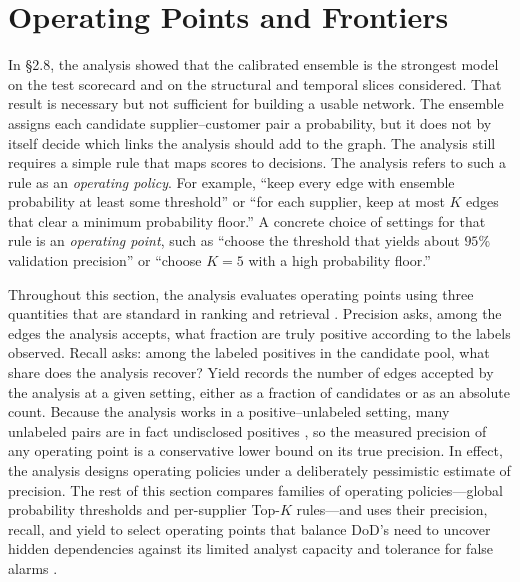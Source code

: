 \section{Operating Points and Frontiers}

In \S2.8, the analysis showed that the calibrated ensemble is the strongest model on the test scorecard and on the structural and temporal slices considered. That result is necessary but not sufficient for building a usable network. The ensemble assigns each candidate supplier--customer pair a probability, but it does not by itself decide which links the analysis should add to the graph. The analysis still requires a simple rule that maps scores to decisions. The analysis refers to such a rule as an \emph{operating policy}. For example, ``keep every edge with ensemble probability at least some threshold'' or ``for each supplier, keep at most \(K\) edges that clear a minimum probability floor.'' A concrete choice of settings for that rule is an \emph{operating point}, such as ``choose the threshold that yields about \(95\%\) validation precision'' or ``choose \(K=5\) with a high probability floor.''

Throughout this section, the analysis evaluates operating points using three quantities that are standard in ranking and retrieval \parencite{manning_introduction_2008}. Precision asks, among the edges the analysis accepts, what fraction are truly positive according to the labels observed. Recall asks: among the labeled positives in the candidate pool, what share does the analysis recover? Yield records the number of edges accepted by the analysis at a given setting, either as a fraction of candidates or as an absolute count. Because the analysis works in a positive--unlabeled setting, many unlabeled pairs are in fact undisclosed positives \parencite{elkan_learning_2008,du_plessis_analysis_2014}, so the measured precision of any operating point is a conservative lower bound on its true precision. In effect, the analysis designs operating policies under a deliberately pessimistic estimate of precision. The rest of this section compares families of operating policies---global probability thresholds and per-supplier Top-\(K\) rules---and uses their precision, recall, and yield to select operating points that balance DoD's need to uncover hidden dependencies against its limited analyst capacity and tolerance for false alarms \parencite{hand_measuring_2009,craighead_severity_2007,pettit_ensuring_2013}.

